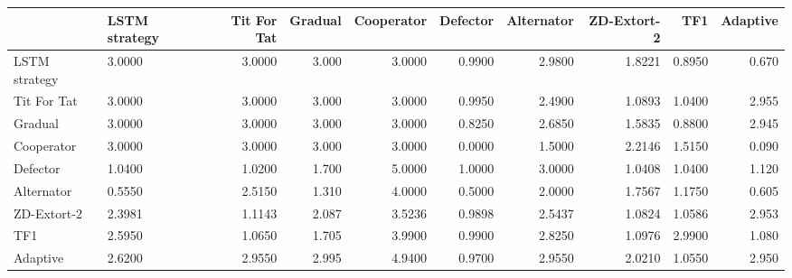 \begin{tabular}{lgrrrrrrrr}
\toprule
{} &  LSTM strategy &  Tit For Tat &  Gradual &  Cooperator &  Defector &  Alternator &  ZD-Extort-2 &     TF1 &  Adaptive \\
\midrule
{}
LSTM strategy &         3.0000 &       3.0000 &    3.000 &      3.0000 &    0.9900 &      2.9800 &       1.8221 &  0.8950 &     0.670 \\
Tit For Tat   &         3.0000 &       3.0000 &    3.000 &      3.0000 &    0.9950 &      2.4900 &       1.0893 &  1.0400 &     2.955 \\
Gradual       &         3.0000 &       3.0000 &    3.000 &      3.0000 &    0.8250 &      2.6850 &       1.5835 &  0.8800 &     2.945 \\
Cooperator    &         3.0000 &       3.0000 &    3.000 &      3.0000 &    0.0000 &      1.5000 &       2.2146 &  1.5150 &     0.090 \\
Defector      &         1.0400 &       1.0200 &    1.700 &      5.0000 &    1.0000 &      3.0000 &       1.0408 &  1.0400 &     1.120 \\
Alternator    &         0.5550 &       2.5150 &    1.310 &      4.0000 &    0.5000 &      2.0000 &       1.7567 &  1.1750 &     0.605 \\
ZD-Extort-2   &         2.3981 &       1.1143 &    2.087 &      3.5236 &    0.9898 &      2.5437 &       1.0824 &  1.0586 &     2.953 \\
TF1           &         2.5950 &       1.0650 &    1.705 &      3.9900 &    0.9900 &      2.8250 &       1.0976 &  2.9900 &     1.080 \\
Adaptive      &         2.6200 &       2.9550 &    2.995 &      4.9400 &    0.9700 &      2.9550 &       2.0210 &  1.0550 &     2.950 \\
\bottomrule
\end{tabular}
